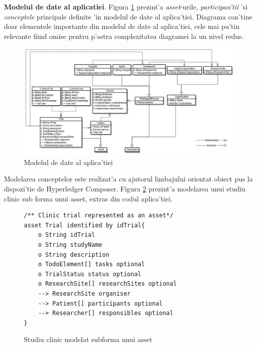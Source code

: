 \documentclass[12pt,a4paper,twoside]{report}
\begin{document}
  \textbf{Modelul de date al aplicatiei}. Figura \ref{fig:daig} prezint'a \emph{asset}-urile, \emph{participan'tii} 'si \emph{conceptele} principale definite 'in modelul de date al aplica'tiei. Diagrama con'tine doar elementele importante din modelul de date al aplica'tiei, cele mai pu'tin relevante fiind omise pentru p'astra complexitatea diagramei la un nivel redus. 
  
      	\begin{figure}[H]
		\begin{center}
			\includegraphics[scale=0.60]{img/daig.PNG}
			\caption{Modelul de date al aplica'tiei}
  			\label{fig:daig}
  		\end{center}
  		\end{figure}
  
  
  Modelarea conceptelor este realizat'a cu ajutorul limbajului orientat obiect pus la dispozi'tie de Hyperledger Composer. Figura \ref{fig:asset} prezint'a modelarea unui studiu clinic sub forma unui asset, extras din codul aplica'tiei. 
  
 	\begin{figure}[H]
		\begin{center}
			\begin{lstlisting}[style=htmlcssjs]
/** Clinic trial represented as an asset*/
asset Trial identified by idTrial{
    o String idTrial
    o String studyName
    o String description 
    o TodoElement[] tasks optional
    o TrialStatus status optional
    o ResearchSite[] researchSites optional
    --> ResearchSite organiser
    --> Patient[] participants optional
    --> Researcher[] responsibles optional
}
			\end{lstlisting}
			\caption{Studiu clinic modelat subforma unui asset}
  			\label{fig:asset}
  		\end{center}
  		\end{figure}
  
\end{document}
